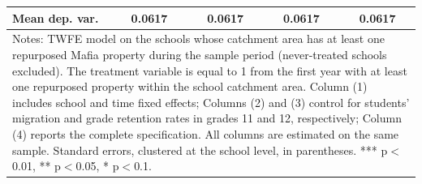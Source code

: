 \documentclass[12pt]{article}
\theoremstyle{plain}
\theoremstyle{plain}
\theoremstyle{plain}
\theoremstyle{definition}
\theoremstyle{plain}
\theoremstyle{definition}
\theoremstyle{plain}
\theoremstyle{remark}
\theoremstyle{definition}
\theoremstyle{definition}
\theoremstyle{plain}
\begin{document}
\begin{table}[H]
{\begin{tabular}{p{8.11em}llll}
			\multicolumn{1}{l}{Mean dep. var.} & \multicolumn{1}{c}{0.0617} & \multicolumn{1}{c}{0.0617} & \multicolumn{1}{c}{0.0617} & \multicolumn{1}{c}{0.0617} \\
			\midrule
			\multicolumn{5}{p{28.11em}}{Notes: TWFE model on the schools whose catchment area has at least one repurposed Mafia property during the sample period (never-treated schools excluded). The treatment variable is equal to 1 from the first year with at least one repurposed property within the school catchment area. Column (1) includes school and time fixed effects; Columns (2) and (3) control for students' migration and grade retention rates in grades 11 and 12, respectively; Column (4) reports the complete specification. All columns are estimated on the same sample. Standard errors, clustered at the school level, in parentheses. *** p$<$0.01, ** p$<$0.05, * p$<$0.1.} \\
		\end{tabular}%
	}
\end{table}
\end{document}
